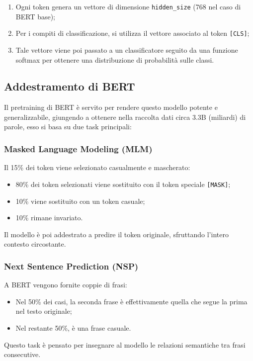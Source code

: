\begin{enumerate}
    \item Ogni token genera un vettore di dimensione \texttt{hidden\_size} (768 nel caso di BERT base);
    \item Per i compiti di classificazione, si utilizza il vettore associato al token \texttt{[CLS]};
    \item Tale vettore viene poi passato a un classificatore seguito da una funzione softmax per ottenere una distribuzione di probabilità sulle classi.
\end{enumerate}

\subsection{Addestramento di BERT}

Il pretraining di BERT è servito per rendere questo modello potente e generalizzabile, giungendo a ottenere nella raccolta dati circa 3.3B (miliardi) di parole, esso si basa su due task principali:

\subsubsection{Masked Language Modeling (MLM)}

Il 15\% dei token viene selezionato casualmente e mascherato:
\begin{itemize}
    \item 80\% dei token selezionati viene sostituito con il token speciale \texttt{[MASK]};
    \item 10\% viene sostituito con un token casuale;
    \item 10\% rimane invariato.
\end{itemize}
Il modello è poi addestrato a predire il token originale, sfruttando l'intero contesto circostante.

\subsubsection{Next Sentence Prediction (NSP)}

A BERT vengono fornite coppie di frasi:
\begin{itemize}
    \item Nel 50\% dei casi, la seconda frase è effettivamente quella che segue la prima nel testo originale;
    \item Nel restante 50\%, è una frase casuale.
\end{itemize}
Questo task è pensato per insegnare al modello le relazioni semantiche tra frasi consecutive.

